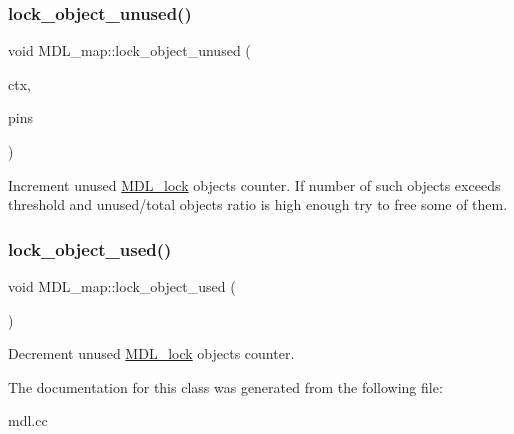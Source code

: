 \subsubsection{\texorpdfstring{lock\+\_\+object\+\_\+unused()}{lock\_object\_unused()}}
{\footnotesize\ttfamily void M\+D\+L\+\_\+map\+::lock\+\_\+object\+\_\+unused (\begin{DoxyParamCaption}\item[{\mbox{\hyperlink{classMDL__context}{M\+D\+L\+\_\+context}} $\ast$}]{ctx,  }\item[{L\+F\+\_\+\+P\+I\+NS $\ast$}]{pins }\end{DoxyParamCaption})\hspace{0.3cm}{\ttfamily [inline]}}

Increment unused \mbox{\hyperlink{classMDL__lock}{M\+D\+L\+\_\+lock}} objects counter. If number of such objects exceeds threshold and unused/total objects ratio is high enough try to free some of them. \mbox{\label{classMDL__map_aa03282e94ef98f16db215151ebf69844}} 
\subsubsection{\texorpdfstring{lock\+\_\+object\+\_\+used()}{lock\_object\_used()}}
{\footnotesize\ttfamily void M\+D\+L\+\_\+map\+::lock\+\_\+object\+\_\+used (\begin{DoxyParamCaption}{ }\end{DoxyParamCaption})\hspace{0.3cm}{\ttfamily [inline]}}

Decrement unused \mbox{\hyperlink{classMDL__lock}{M\+D\+L\+\_\+lock}} objects counter. 

The documentation for this class was generated from the following file\+:\begin{DoxyCompactItemize}
\item 
mdl.\+cc\end{DoxyCompactItemize}
